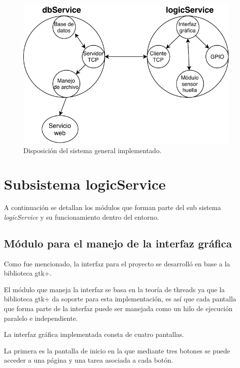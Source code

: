 \begin{figure}[H]
	\centering
	\includegraphics[scale=1]{./Figures/sistemagen.pdf}
	\caption{Disposición del sistema general implementado.}
	\label{fig:sistemagen}
\end{figure}

\section{Subsistema logicService}
A continuación se detallan los módulos que forman parte del sub sistema \textit{logicService} y su funcionamiento dentro del entorno.

\subsection{Módulo para el manejo de la interfaz gráfica}
Como fue mencionado, la interfaz para el proyecto se desarrolló en base a la biblioteca gtk+. 

El módulo que maneja la interfaz se basa en la teoría de threads ya que la biblioteca gtk+ da soporte para esta implementación, es así que cada pantalla que forma parte de la interfaz puede ser manejada como un hilo de ejecución paralelo e independiente.

La interfaz gráfica implementada consta de cuatro pantallas. 

La primera es la pantalla de inicio en la que mediante tres botones se puede acceder a una página y una tarea asociada a cada botón.

